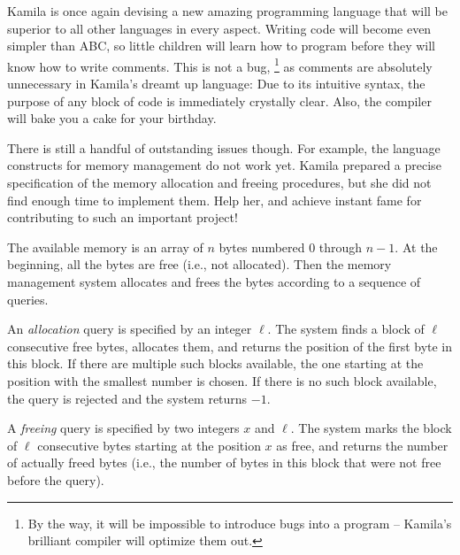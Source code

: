 





Kamila is once again devising a new amazing programming language that will be
superior to all other languages in every aspect. Writing code will become even
simpler than ABC, so little children will learn how to program before they will
know how to write comments. This is not a bug,%
\footnote{By the way, it will be impossible to introduce bugs into a program --
Kamila's brilliant compiler will optimize them out.}
as comments are absolutely unnecessary in Kamila's dreamt up language: Due to
its intuitive syntax, the purpose of any block of code is immediately crystally
clear. Also, the compiler will bake you a cake for your birthday.

There is still a handful of outstanding issues though. For example, the language
constructs for memory management do not work yet. Kamila prepared a precise
specification of the memory allocation and freeing procedures, but she did not
find enough time to implement them. Help her, and achieve instant fame for
contributing to such an important project!



The available memory is an array of $n$ bytes numbered $0$ through $n-1$. At the
beginning, all the bytes are free (i.e., not allocated). Then the memory
management system allocates and frees the bytes according to a sequence of
queries.

An \emph{allocation} query is specified by an integer $\ell$. The system finds a
block of $\ell$ consecutive free bytes, allocates them, and returns the position
of the first byte in this block. If there are multiple such blocks available,
the one starting at the position with the smallest number is chosen. If there is
no such block available, the query is rejected and the system returns $-1$.

A \emph{freeing} query is specified by two integers $x$ and $\ell$. The system
marks the block of $\ell$ consecutive bytes starting at the position $x$ as
free, and returns the number of actually freed bytes (i.e., the number of bytes
in this block that were not free before the query).



